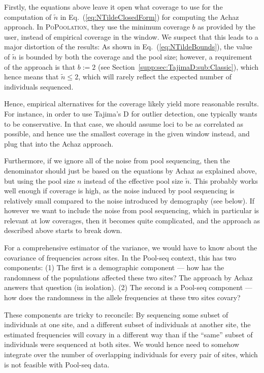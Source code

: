 \documentclass[a4paper,fontsize=9pt,DIV=14]{scrartcl}
\newcommand\toolname{\textsc}
\newcommand\eqnref[1]{Eq.~(\ref{#1})}
\newcommand\secref[1]{Section~\ref{#1}}
\begin{document}
Firstly, the equations above leave it open what coverage to use for the computation of $\tilde{n}$ in \eqnref{eq:NTildeClosedForm} for computing the Achaz approach.  In \toolname{PoPoolation}, they use the minimum coverage $b$ as provided by the user, instead of empirical coverage in the window.  We suspect that this leads to a major distortion of the results:  As shown in \eqnref{eq:NTildeBounds}, the value of $\tilde{n}$ is bounded by both the coverage and the pool size; however, a requirement of the approach is that $b := 2$ (see \secref{supp:sec:TajimaD:sub:Classic}), which hence means that $\tilde{n} \leq 2$, which will rarely reflect the expected number of individuals sequenced.

Hence, empirical alternatives for the coverage likely yield more reasonable results. For instance, in order to use Tajima's D for outlier detection, one typically wants to be conservative. In that case, we should assume loci to be as correlated as possible, and hence use the smallest coverage in the given window instead, and plug that into the Achaz approach.

Furthermore, if we ignore all of the noise from pool sequencing, then the denominator should just be based on the equations by Achaz as explained above, but using the pool size $n$ instead of the effective pool size $\tilde{n}$.  This probably works well enough if coverage is high, as the noise induced by pool sequencing is relatively small compared to the noise introduced by demography (see below).  If however we want to include the noise from pool sequencing, which in particular is relevant at low coverages, then it becomes quite complicated, and the approach as described above starts to break down.

For a comprehensive estimator of the variance, we would have to know about the covariance of frequencies across sites. In the Pool-seq context, this has two components: (1) The first is a demographic component --- how has the randomness of the populations affected these two sites? The approach by Achaz answers that question (in isolation).  (2) The second is a Pool-seq component --- how does the randomness in the allele frequencies at these two sites covary?

These components are tricky to reconcile: By sequencing some subset of individuals at one site, and a different subset of individuals at another site, the estimated frequencies will covary in a different way than if the ``same'' subset of individuals were sequenced at both sites.  We would hence need to somehow integrate over the number of overlapping individuals for every pair of sites, which is not feasible with Pool-seq data.
\end{document}
